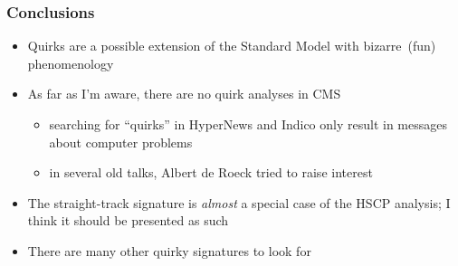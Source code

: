 \documentclass[compress]{beamer}
\begin{document}
\begin{frame}
\frametitle{Conclusions}

\begin{itemize}\setlength{\itemsep}{0.25 cm}
\item Quirks are a possible extension of the Standard Model with bizarre~(fun) phenomenology
\item As far as I'm aware, there are no quirk analyses in CMS
\begin{itemize}
\item searching for ``quirks'' in HyperNews and Indico only result in messages about computer problems
\item in several old talks, Albert de Roeck tried to raise interest
\end{itemize}
\item The straight-track signature is {\it almost} a special case of the HSCP analysis; I think it should be presented as such
\item There are many other quirky signatures to look for
\end{itemize}
\label{numpages}
\end{frame}
\end{document}
